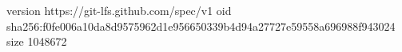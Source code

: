 version https://git-lfs.github.com/spec/v1
oid sha256:f0fe006a10da8d9575962d1e956650339b4d94a27727e59558a696988f943024
size 1048672
